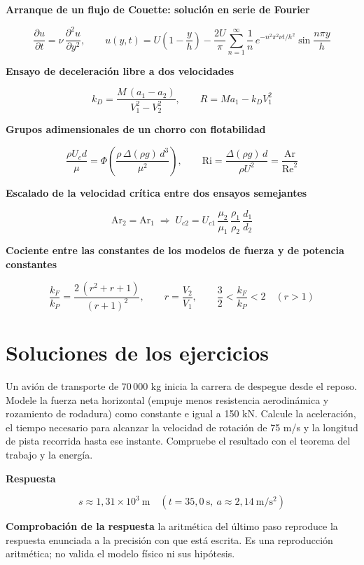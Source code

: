 \documentclass[10pt,openany]{book}
\begin{document}
\noindent\textbf{Arranque de un flujo de Couette: solución en serie de Fourier}

\[
\frac{\partial u}{\partial t} = \nu\,\frac{\partial^{2}u}{\partial y^{2}},\qquad u(y,t) = U\left(1 - \frac{y}{h}\right) - \frac{2U}{\pi}\sum_{n=1}^{\infty}\frac{1}{n}\,e^{-n^{2}\pi^{2}\nu t/h^{2}}\sin\frac{n\pi y}{h}
\]

\noindent\textbf{Ensayo de deceleración libre a dos velocidades}

\[
k_D = \frac{M\,(a_1 - a_2)}{V_1^{2} - V_2^{2}},\qquad R = M a_1 - k_D V_1^{2}
\]

\noindent\textbf{Grupos adimensionales de un chorro con flotabilidad}

\[
\frac{\rho U_c d}{\mu} = \Phi\!\left(\frac{\rho\,\Delta(\rho g)\,d^{3}}{\mu^{2}}\right),\qquad \mathrm{Ri} = \frac{\Delta(\rho g)\,d}{\rho U^{2}} = \frac{\mathrm{Ar}}{\mathrm{Re}^{2}}
\]

\noindent\textbf{Escalado de la velocidad crítica entre dos ensayos semejantes}

\[
\mathrm{Ar}_2 = \mathrm{Ar}_1 \;\Rightarrow\; U_{c2} = U_{c1}\,\frac{\mu_2}{\mu_1}\,\frac{\rho_1}{\rho_2}\,\frac{d_1}{d_2}
\]

\noindent\textbf{Cociente entre las constantes de los modelos de fuerza y de potencia constantes}

\[
\frac{k_F}{k_P} = \frac{2\,(r^{2} + r + 1)}{(r + 1)^{2}},\qquad r = \frac{V_2}{V_1},\qquad \frac{3}{2} < \frac{k_F}{k_P} < 2\quad (r > 1)
\]
\chapter{Soluciones de los ejercicios}

Un avión de transporte de \(70\,000\) kg inicia la carrera de despegue desde el reposo. Modele la fuerza neta horizontal (empuje menos resistencia aerodinámica y rozamiento de rodadura) como constante e igual a 150 kN. Calcule la aceleración, el tiempo necesario para alcanzar la velocidad de rotación de 75 m/s y la longitud de pista recorrida hasta ese instante. Compruebe el resultado con el teorema del trabajo y la energía.

\noindent\textbf{Respuesta}

\[
s \approx 1{,}31\times 10^{3}\ \mathrm{m}\quad (t = 35{,}0\ \mathrm{s},\ a \approx 2{,}14\ \mathrm{m/s^{2}})
\]

\noindent\textbf{Comprobación de la respuesta} la aritmética del último paso reproduce la respuesta enunciada a la precisión con que está escrita. Es una reproducción aritmética; no valida el modelo físico ni sus hipótesis.
\end{document}
